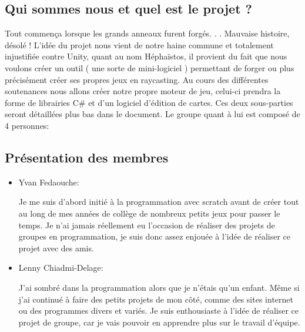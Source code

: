 \documentclass[french, 12pt]{article}
\begin{document}
    \subsection{Qui sommes nous et quel est le projet ?}
    \color{black}
    \begin{flushleft}

    Tout commença lorsque les grands anneaux furent forgés. . . Mauvaise histoire, désolé ! L’idée du projet nous vient de notre haine commune et totalement injustifiée contre Unity, quant au nom Héphaïstos, il provient du fait que nous voulons créer un outil ( une sorte de mini-logiciel ) permettant de forger ou plus précisément créer ses propres jeux en raycasting. Au cours des différentes soutenances nous allons créer notre propre moteur de jeu, celui-ci prendra la forme de librairies C\# et d’un logiciel d'édition de cartes. Ces deux sous-parties seront détaillées plus bas dans le document. Le groupe quant à lui est composé de 4 personnes:



    \subsection{Présentation des membres}
    \vspace{0.45cm}
    \color{black}
    \begin{itemize}

    \item Yvan Fedaouche: \newline

    Je me suis d’abord initié à la programmation avec scratch avant de créer tout au long de mes années de collège de nombreux petits jeux pour passer le temps. Je n’ai jamais réellement eu l’occasion de réaliser des projets de groupes en programmation, je suis donc assez enjouée à l’idée de réaliser ce projet avec des amis.

    \vspace{0.75cm}

    \item Lenny Chiadmi-Delage: \newline

    J’ai sombré dans la programmation alors que je n'étais qu’un enfant. Même si j’ai continué à faire des petits projets de mon côté, comme des sites internet ou des programmes divers et variés. Je suis enthousiaste à l'idée de réaliser ce projet de groupe, car je vais pouvoir en apprendre plus sur le travail d'équipe. 


\end{itemize}
\end{flushleft}
\end{document}
